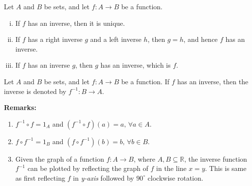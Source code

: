 \documentclass[a4paper,english,12pt]{article}
\begin{document}
\begin{lem}
Let $A$ and $B$ be sets, and let $f:A\rightarrow B$ be a function.
\begin{enumerate}[i)]
\item If $f$ has an inverse, then it is unique.
\item If $f$ has a right inverse $g$ and a left inverse $h$, then $g=h$, and hence $f$ has an inverse.
\item If $f$ has an inverse $g$, then $g$ has an inverse, which is $f$.
\end{enumerate}
\end{lem}

\begin{defn}
Let $A$ and $B$ be sets, and let $f:A\rightarrow B$ be a function. If $f$ has an inverse, then the inverse is denoted by $f^{-1}:B\rightarrow A$.
\end{defn}

\noindent \textbf{Remarks:} 
\begin{enumerate}
\item $f^{-1}\circ f=1_A$ and $(f^{-1}\circ f)(a)=a,\,\forall a\in A$.
\item $f\circ f^{-1}=1_B$ and $(f\circ f^{-1})(b)=b,\,\forall b\in B$.
\item Given the graph of a function $f:A\rightarrow B$, where $A,B\subseteq \mathbb{R}$, the inverse function $f^{-1}$ can be plotted by reflecting the graph of $f$ in the line $x=y$. This is same as first reflecting $f$ in \textit{y-axis} followed by $90^{\circ}$ clockwise rotation.
\end{enumerate}
\end{document}
